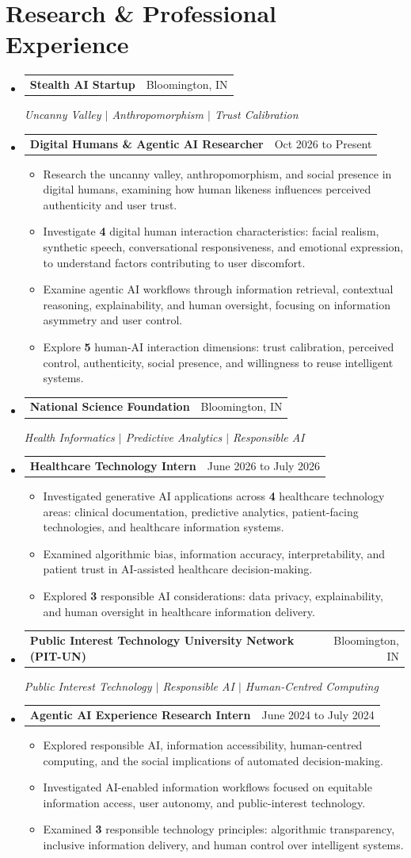 \documentclass[letterpaper,10pt]{article}
\makeatletter
\newcommand{\resumeRole}[2]{%
  \item
    \begin{tabular*}{\textwidth}[t]{l@{\extracolsep{\fill}}r}
      \textbf{#1} & {#2} \\
    \end{tabular*}%
}
\newcommand{\resumeOrg}[2]{%
  \item
    \begin{tabular*}{\textwidth}[t]{l@{\extracolsep{\fill}}r}
      \textbf{#1} & {#2} \\
    \end{tabular*}%
}
\newcommand{\resumeItem}[1]{\item{#1}}
\newcommand{\resumeSubHeadingListStart}{%
  \begin{itemize}[leftmargin=0pt, label={}, itemsep=1.1pt, parsep=0pt, topsep=0.3pt, partopsep=0pt]
}
\newcommand{\resumeSubHeadingListEnd}{\end{itemize}}
\newcommand{\resumeItemListStart}{%
  \begin{itemize}[leftmargin=0.28in, labelsep=4.96pt, labelindent=0.10in, itemindent=0pt, labelwidth=8pt, align=left, label=\textbullet, itemsep=0.15pt, parsep=0pt, topsep=0.15pt, partopsep=0pt]
  \fontsize{10}{10.4}\selectfont
}
\newcommand{\resumeItemListEnd}{\end{itemize}}
\makeatother
\begin{document}
\section{Research \& Professional Experience}
\resumeSubHeadingListStart
  \resumeOrg{Stealth AI Startup}{Bloomington, IN}
  \textit{Uncanny Valley $\vert$ Anthropomorphism $\vert$ Trust Calibration}\\[-1pt]
  \resumeRole{Digital Humans \& Agentic AI Researcher}{Oct 2026 to Present}
    \resumeItemListStart
      \resumeItem{Research the uncanny valley, anthropomorphism, and social presence in digital humans, examining how human likeness influences perceived authenticity and user trust.}
      \resumeItem{Investigate \textbf{4} digital human interaction characteristics: facial realism, synthetic speech, conversational responsiveness, and emotional expression, to understand factors contributing to user discomfort.}
      \resumeItem{Examine agentic AI workflows through information retrieval, contextual reasoning, explainability, and human oversight, focusing on information asymmetry and user control.}
      \resumeItem{Explore \textbf{5} human-AI interaction dimensions: trust calibration, perceived control, authenticity, social presence, and willingness to reuse intelligent systems.}
    \resumeItemListEnd

  \resumeOrg{National Science Foundation}{Bloomington, IN}
  \textit{Health Informatics $\vert$ Predictive Analytics $\vert$ Responsible AI}\\[-1pt]
  \resumeRole{Healthcare Technology Intern}{June 2026 to July 2026}
    \resumeItemListStart
      \resumeItem{Investigated generative AI applications across \textbf{4} healthcare technology areas: clinical documentation, predictive analytics, patient-facing technologies, and healthcare information systems.}
      \resumeItem{Examined algorithmic bias, information accuracy, interpretability, and patient trust in AI-assisted healthcare decision-making.}
      \resumeItem{Explored \textbf{3} responsible AI considerations: data privacy, explainability, and human oversight in healthcare information delivery.}
    \resumeItemListEnd

  \resumeOrg{Public Interest Technology University Network (PIT-UN)}{Bloomington, IN}
  \textit{Public Interest Technology $\vert$ Responsible AI $\vert$ Human-Centred Computing}\\[-1pt]
  \resumeRole{Agentic AI Experience Research Intern}{June 2024 to July 2024}
    \resumeItemListStart
      \resumeItem{Explored responsible AI, information accessibility, human-centred computing, and the social implications of automated decision-making.}
      \resumeItem{Investigated AI-enabled information workflows focused on equitable information access, user autonomy, and public-interest technology.}
      \resumeItem{Examined \textbf{3} responsible technology principles: algorithmic transparency, inclusive information delivery, and human control over intelligent systems.}
    \resumeItemListEnd
\resumeSubHeadingListEnd
\end{document}
